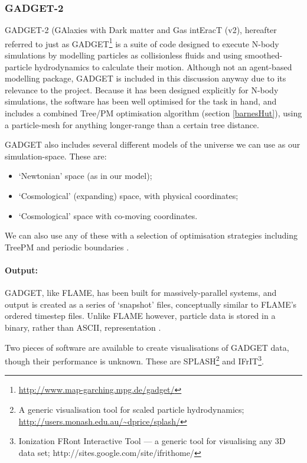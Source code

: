 \documentclass[11pt,a4paper]{article}
\begin{document}
\subsubsection{GADGET-2}
\label{gadget2}
GADGET-2 (GAlaxies with Dark matter and Gas intEracT (v2), hereafter referred to just as GADGET\footnote{\url{http://www.map-garching.mpg.de/gadget/}} is a suite of code designed to execute N-body simulations by modelling particles as collisionless fluids and using smoothed-particle hydrodynamics to calculate their motion. Although not an agent-based modelling package, GADGET is included in this discussion anyway due to its relevance to the project. Because it has been designed explicitly for N-body simulations, the software has been well optimised for the task in hand, and includes a combined Tree/PM optimisation algorithm (section \ref{barnesHut}), using a particle-mesh for anything longer-range than a certain tree distance.\cite{gadgetDoc}

  GADGET also includes several different models of the universe we can use as our simulation-space. These are: 
\begin{itemize}
  \item `Newtonian' space (as in our model);
  \item `Cosmological' (expanding) space, with physical coordinates;
  \item `Cosmological' space with co-moving coordinates.
  \end{itemize} 
\noindent We can also use any of these with a selection of optimisation strategies including TreePM and periodic boundaries \cite{gadgetDoc}.

\paragraph{Output:}
GADGET, like FLAME, has been built for massively-parallel systems, and output is created as a series of `snapshot' files, conceptually similar to FLAME's ordered timestep files. Unlike FLAME however, particle data is stored in a binary, rather than ASCII, representation \cite{gadgetDoc}.

Two pieces of software are available to create visualisations of GADGET data, though their performance is unknown. These are SPLASH\footnote{A generic visualisation tool for scaled particle hydrodynamics; \url{http://users.monash.edu.au/~dprice/splash/}} and IFrIT\footnote{Ionization FRont Interactive Tool --- a generic tool for visualising any 3D data set; http://sites.google.com/site/ifrithome/}.
\end{document}
